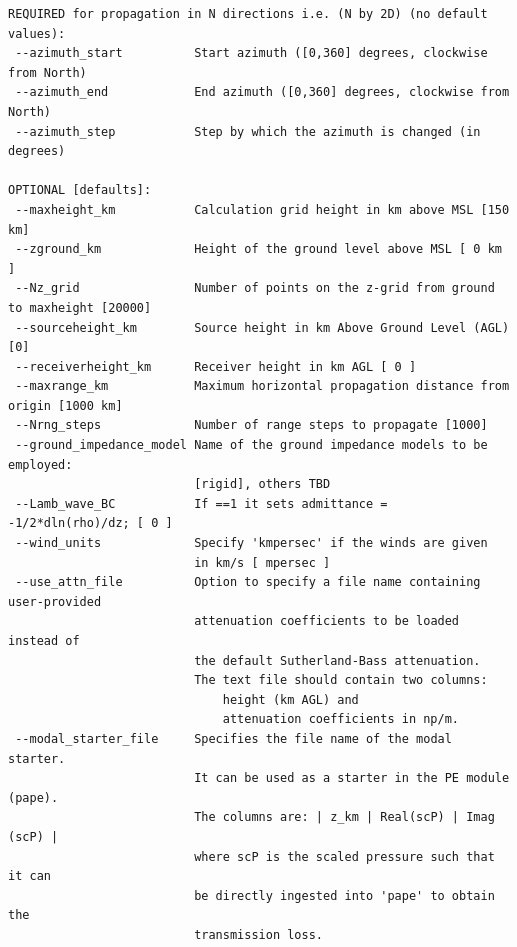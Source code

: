 \begin{verbatim}
REQUIRED for propagation in N directions i.e. (N by 2D) (no default values):
 --azimuth_start          Start azimuth ([0,360] degrees, clockwise from North)
 --azimuth_end            End azimuth ([0,360] degrees, clockwise from North)
 --azimuth_step           Step by which the azimuth is changed (in degrees)

OPTIONAL [defaults]:
 --maxheight_km           Calculation grid height in km above MSL [150 km]
 --zground_km             Height of the ground level above MSL [ 0 km ]
 --Nz_grid                Number of points on the z-grid from ground to maxheight [20000]
 --sourceheight_km        Source height in km Above Ground Level (AGL) [0]
 --receiverheight_km      Receiver height in km AGL [ 0 ]
 --maxrange_km            Maximum horizontal propagation distance from origin [1000 km]
 --Nrng_steps             Number of range steps to propagate [1000]
 --ground_impedance_model Name of the ground impedance models to be employed:
                          [rigid], others TBD
 --Lamb_wave_BC           If ==1 it sets admittance = -1/2*dln(rho)/dz; [ 0 ]
 --wind_units             Specify 'kmpersec' if the winds are given
                          in km/s [ mpersec ]
 --use_attn_file          Option to specify a file name containing user-provided
                          attenuation coefficients to be loaded instead of 
                          the default Sutherland-Bass attenuation. 
                          The text file should contain two columns: 
                              height (km AGL) and 
                              attenuation coefficients in np/m.
 --modal_starter_file     Specifies the file name of the modal starter.
                          It can be used as a starter in the PE module (pape).
                          The columns are: | z_km | Real(scP) | Imag (scP) |
                          where scP is the scaled pressure such that it can
                          be directly ingested into 'pape' to obtain the
                          transmission loss.


\end{verbatim}
